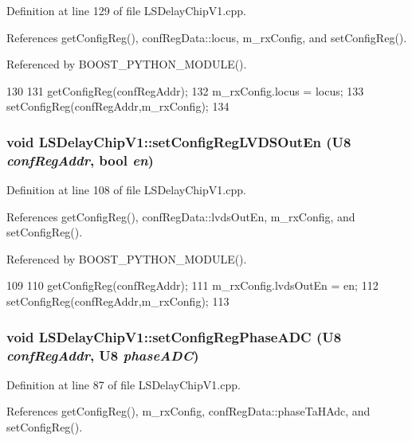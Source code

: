 Definition at line 129 of file LSDelayChipV1.cpp.

References getConfigReg(), confRegData::locus, m\_\-rxConfig, and setConfigReg().

Referenced by BOOST\_\-PYTHON\_\-MODULE().


\begin{DoxyCode}
130 {
131     getConfigReg(confRegAddr);
132     m_rxConfig.locus = locus;
133     setConfigReg(confRegAddr,m_rxConfig);
134 }
\end{DoxyCode}
\hypertarget{classLSDelayChipV1_a46a7aee8c7373c6858af9ecd29e9b116}{
\subsubsection[{setConfigRegLVDSOutEn}]{\setlength{\rightskip}{0pt plus 5cm}void LSDelayChipV1::setConfigRegLVDSOutEn ({\bf U8} {\em confRegAddr}, \/  bool {\em en})}}
\label{classLSDelayChipV1_a46a7aee8c7373c6858af9ecd29e9b116}


Definition at line 108 of file LSDelayChipV1.cpp.

References getConfigReg(), confRegData::lvdsOutEn, m\_\-rxConfig, and setConfigReg().

Referenced by BOOST\_\-PYTHON\_\-MODULE().


\begin{DoxyCode}
109 {
110     getConfigReg(confRegAddr);
111     m_rxConfig.lvdsOutEn = en;
112     setConfigReg(confRegAddr,m_rxConfig);
113 }
\end{DoxyCode}
\hypertarget{classLSDelayChipV1_ad83fb046d3576cdccdb4b4fe59f7ff71}{
\subsubsection[{setConfigRegPhaseADC}]{\setlength{\rightskip}{0pt plus 5cm}void LSDelayChipV1::setConfigRegPhaseADC ({\bf U8} {\em confRegAddr}, \/  {\bf U8} {\em phaseADC})}}
\label{classLSDelayChipV1_ad83fb046d3576cdccdb4b4fe59f7ff71}


Definition at line 87 of file LSDelayChipV1.cpp.

References getConfigReg(), m\_\-rxConfig, confRegData::phaseTaHAdc, and setConfigReg().

